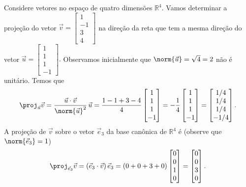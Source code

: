 \begin{ex}\label{canon}
	Considere vetores no espaço de quatro dimensões $\mathbb{R}^4$. Vamos determinar a projeção do vetor $\vec{v} =
	\begin{bmatrix}
	1 \\ -1 \\ 3 \\ 4
	\end{bmatrix}$ na direção da reta que tem a mesma direção do vetor $\vec{u} =
	\begin{bmatrix}
	1 \\ 1 \\ 1 \\ -1
	\end{bmatrix}.$ Observamos inicialmente que $\norm{\vec{u}} = \sqrt{4} = 2$ não é unitário. Temos que
	\begin{equation}
	\proj_{\vec{u}} \vec{v} =  \frac{\vec{u} \cdot \vec{v}}{\norm{\vec{u}}^2} \, \vec{u} = \frac{1 - 1 + 3 - 4}{4}
	\begin{bmatrix}
	1 \\ 1 \\ 1 \\ -1
	\end{bmatrix} =
	-\frac{1}{4}
	\begin{bmatrix}
	1 \\ 1 \\ 1 \\ -1
	\end{bmatrix} =
	\begin{bmatrix}
	1/4 \\ 1/4 \\ 1/4 \\ -1/4
	\end{bmatrix}.
	\end{equation} A projeção de $\vec{v}$ sobre o vetor $\vec{e}_3$ da base canônica de $\mathbb{R}^4$ é (observe que $\norm{\vec{e}_3} = 1$)
	\begin{equation}
	\proj_{\vec{e}_3} \vec{v} = (\vec{e}_3 \cdot \vec{v}) \, \vec{e}_3 = (0 + 0 + 3 + 0)
	\begin{bmatrix}
	0 \\ 0 \\ 1 \\ 0
	\end{bmatrix} = \begin{bmatrix}
	0 \\ 0 \\ 3 \\ 0
	\end{bmatrix}.

\end{equation}
\end{ex}
